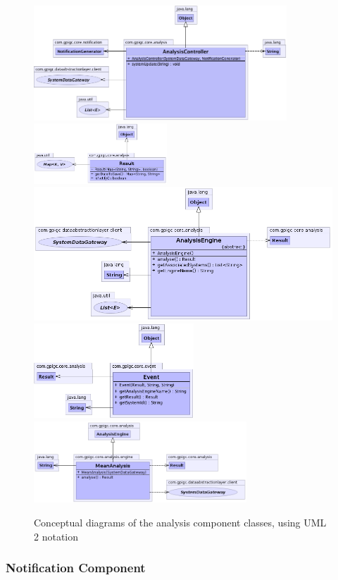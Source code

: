 \documentclass[10pt,a4paper]{article}
\begin{document}
\begin{figure}[ht!]
  \centering
  \includegraphics[width= 9.5cm]{images/Analysis/AnalysisController.png}
  \includegraphics[width= 5cm]{images/Analysis/Result.png}
  \includegraphics[width= 12cm]{images/Analysis/AnalysisEngine.png}
  \includegraphics[width= 6cm]{images/Analysis/Event.png}
  \includegraphics[width= 8cm]{images/Analysis/MeanAnalysis.png}
  \caption{Conceptual diagrams of the analysis component classes, using 
UML 2 notation}
  \label{fig:dataAnalysisComponent}
\end{figure}

\subsubsection{Notification Component}
\end{document}
